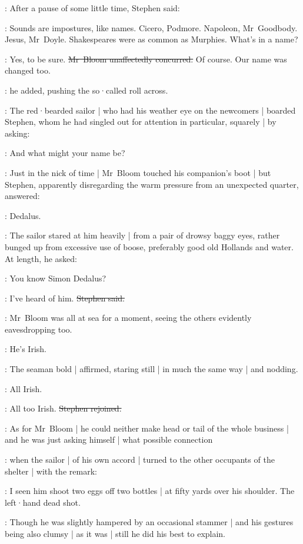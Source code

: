 :
After a pause of some little time,
Stephen said:

\Stephen:
Sounds are impostures,
like names.
Cicero,
Podmore.
Napoleon,
Mr~Goodbody.
Jesus,
Mr~Doyle.
Shakespeares were as common as Murphies.
What's in a name?

\Bloom:
Yes,
to be sure.
\sout{Mr~Bloom unaffectedly concurred.}
Of course.
Our name was changed too.

:
he added,
pushing the so·called roll across.

:
The red·bearded sailor |
who had his weather eye on the newcomers |
boarded Stephen,
whom he had singled out for attention in particular,
squarely |
by asking:

\Murphy:
And what might your name be?%

:
Just in the nick of time |
Mr~Bloom touched his companion's boot |
but Stephen,
apparently disregarding the warm pressure from an unexpected quarter,
answered:

\Stephen:
Dedalus.

:
The sailor stared at him heavily |
from a pair of drowsy baggy eyes,
rather bunged up from excessive use of boose,
preferably good old Hollands and water.
At length,
he asked:

\Murphy:
You know Simon Dedalus?

\Stephen:
I've heard of him.
\sout{Stephen said.}

:
Mr~Bloom was all at sea for a moment,
seeing the others evidently eavesdropping too.

\Murphy:
He's Irish.

:
The seaman bold |
affirmed,
staring still |
in much the same way |
and nodding.

\Murphy:
All Irish.

\Stephen:
All too Irish.
\sout{Stephen rejoined.}

:
As for Mr~Bloom |
he could neither make head or tail of the whole business |
and he was just asking himself |
what possible connection

:
when the sailor |
of his own accord |
turned to the other occupants of the shelter |
with the remark:

\Murphy:
I seen him shoot two eggs off two bottles |
at fifty yards over his shoulder.
The left·hand dead shot.%

:
Though he was slightly hampered by an occasional stammer |
and his gestures being also clumsy |
as it was |
still he did his best to explain.

